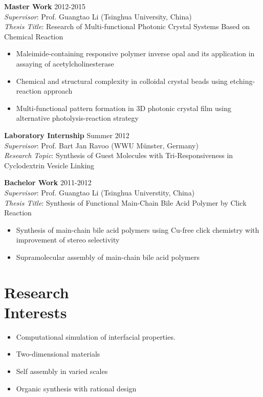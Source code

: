 \documentclass[margin]{res}
\begin{document}
\begin{resume}
\textbf{Master Work} \hfill 2012-2015\\
\textit{Supervisor}: Prof. Guangtao Li (Tsinghua University, China)\\
 \textit{Thesis Title}: Research of Multi-functional Photonic Crystal Systems Based on Chemical Reaction
 \begin{itemize} \itemsep -2pt  %
 \item Maleimide-containing responsive polymer inverse opal and its application in assaying  of acetylcholinesterase
 \item Chemical and structural complexity in colloidal crystal beads using etching-reaction approach
 \item Multi-functional pattern formation in 3D photonic crystal film using alternative photolysis-reaction strategy
 \end{itemize}

\textbf{Laboratory Internship} \hfill Summer 2012\\
 \textit{Supervisor}: Prof. Bart Jan Ravoo (WWU M\"{u}nster, Germany)\\
 \textit{Research Topic}: Synthesis of Guest Molecules with Tri-Responsiveness in Cyclodextrin Vesicle Linking


\textbf{Bachelor Work} \hfill 2011-2012\\
\textit{Supervisor}: Prof. Guangtao Li (Tsinghua Universtity, China)\\
 \textit{Thesis Title}: Synthesis of Functional Main-Chain Bile Acid Polymer by Click Reaction
 \begin{itemize} \itemsep -2pt  %
 \item Synthesis of main-chain bile acid polymers using Cu-free click chemistry with improvement of stereo selectivity
 \item Supramolecular assembly of main-chain bile acid polymers
 \end{itemize}


\section{Research \\Interests}
              \begin{itemize}
                \item Computational simulation of interfacial properties.
                \item Two-dimensional materials
                \item Self assembly in varied scales
                \item Organic synthesis with    rational design
		          \end{itemize}





\end{resume}
\end{document}
